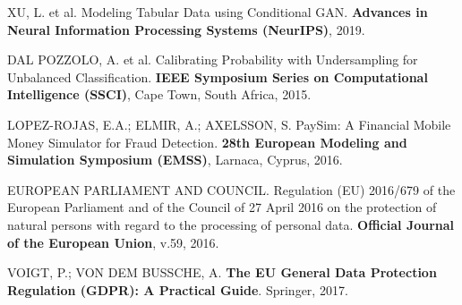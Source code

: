XU, L. et al.
Modeling Tabular Data using Conditional GAN.
{\bf Advances in Neural Information Processing Systems (NeurIPS)}, 2019.


DAL POZZOLO, A. et al.
Calibrating Probability with Undersampling for Unbalanced Classification.
{\bf IEEE Symposium Series on Computational Intelligence (SSCI)},
Cape Town, South Africa, 2015.

LOPEZ-ROJAS, E.A.; ELMIR, A.; AXELSSON, S.
PaySim: A Financial Mobile Money Simulator for Fraud Detection.
{\bf 28th European Modeling and Simulation Symposium (EMSS)},
Larnaca, Cyprus, 2016.


EUROPEAN PARLIAMENT AND COUNCIL.
Regulation (EU) 2016/679 of the European Parliament and of the Council of 27 April 2016 on the protection of natural persons with regard to the processing of personal data.
{\bf Official Journal of the European Union}, v.59, 2016.

VOIGT, P.; VON DEM BUSSCHE, A.
{\bf The EU General Data Protection Regulation (GDPR): A Practical Guide}.
Springer, 2017.
